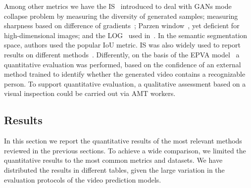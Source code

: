 Among other metrics we have the \ac{IS}~\cite{Salimans2016} introduced to deal with \acp{GAN} mode collapse problem by measuring the diversity of generated samples; measuring sharpness based on difference of gradients~\cite{Mathieu2016}; Parzen window~\cite{Breuleux2011}, yet deficient for high-dimensional images; and the \ac{LOG}~\cite{Hildreth1980,Denton2015} used in~\cite{Kwon2019}. In the semantic segmentation space, authors used the popular \ac{IoU} metric. \ac{IS} was also widely used to report results on different methods~\cite{Walker2017,Vondrick2016,Denton2017,Villegas2017a}. Differently, on the basis of the \ac{EPVA} model~\cite{Wichers2018} a quantitative evaluation was performed, based on the confidence of an external method trained to identify whether the generated video contains a recognizable person. To support quantitative evaluation, a qualitative assessment based on a visual inspection could be carried out via \ac{AMT} workers.

\subsection{Results}
In this section we report the quantitative results of the most relevant methods reviewed in the previous sections. To achieve a wide comparison, we limited the quantitative results to the most common metrics and datasets. We have distributed the results in different tables, given the large variation in the evaluation protocols of the video prediction models. 

